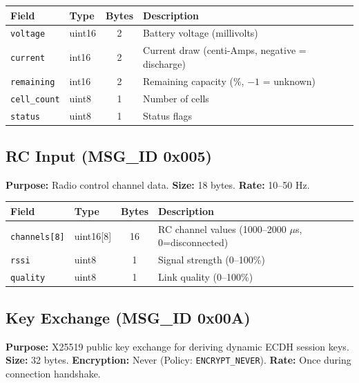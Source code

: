 \documentclass[11pt,a4paper]{article}
\begin{document}
\begin{table}[H]
\centering
\begin{tabular}{@{}llcl@{}}
\toprule
\textbf{Field} & \textbf{Type} & \textbf{Bytes} & \textbf{Description} \\
\midrule
\texttt{voltage}    & uint16 & 2 & Battery voltage (millivolts) \\
\texttt{current}    & int16  & 2 & Current draw (centi-Amps, negative = discharge) \\
\texttt{remaining}  & int16  & 2 & Remaining capacity (\%, $-1$ = unknown) \\
\texttt{cell\_count} & uint8  & 1 & Number of cells \\
\texttt{status}     & uint8  & 1 & Status flags \\
\bottomrule
\end{tabular}
\end{table}

\subsection{RC Input (MSG\_ID 0x005)}

\textbf{Purpose:} Radio control channel data. \textbf{Size:} 18 bytes. \textbf{Rate:} 10--50 Hz.

\begin{table}[H]
\centering
\begin{tabular}{@{}llcl@{}}
\toprule
\textbf{Field} & \textbf{Type} & \textbf{Bytes} & \textbf{Description} \\
\midrule
\texttt{channels[8]} & uint16[8] & 16 & RC channel values (1000--2000 $\mu$s, 0=disconnected) \\
\texttt{rssi}         & uint8     & 1  & Signal strength (0--100\%) \\
\texttt{quality}      & uint8     & 1  & Link quality (0--100\%) \\
\bottomrule
\end{tabular}
\end{table}

\subsection{Key Exchange (MSG\_ID 0x00A)}

\textbf{Purpose:} X25519 public key exchange for deriving dynamic ECDH session keys. \textbf{Size:} 32 bytes. \textbf{Encryption:} Never (Policy: \texttt{ENCRYPT\_NEVER}). \textbf{Rate:} Once during connection handshake.
\end{document}
